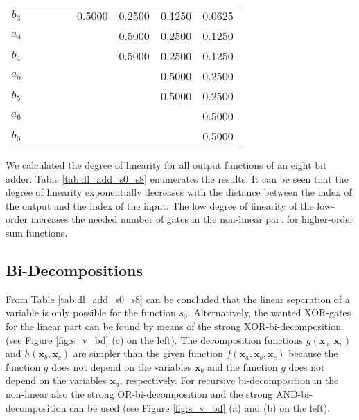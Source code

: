 \documentclass[a4paper]{article}
\newcommand\bx{\mathbf{x}}
\begin{document}
\begin{table}
\begin{tabular}{ccccccccc}
$b_3$	&         &        &        &        & 0.5000 & 0.2500 & 0.1250 & 0.0625 \\ %
$a_4$	&         &        &        &        &        & 0.5000 & 0.2500 & 0.1250 \\ %
$b_4$	&         &        &        &        &        & 0.5000 & 0.2500 & 0.1250 \\ %
$a_5$	&         &        &        &        &        &        & 0.5000 & 0.2500 \\ %
$b_5$	&         &        &        &        &        &        & 0.5000 & 0.2500 \\ %
$a_6$	&         &        &        &        &        &        &        & 0.5000 \\ %
$b_6$	&         &        &        &        &        &        &        & 0.5000 \\ %
\bottomrule
		\end{tabular}
\end{table}

We calculated the degree of linearity for all output functions of an eight bit adder. Table \ref{tab:dl_add_s0_s8} enumerates the results. It can be seen that the degree of linearity exponentially decreases with the distance between the index of the output and the index of the input. The low degree of linearity of the low-order increases the needed number of gates in the non-linear part for higher-order sum functions.

\subsection{Bi-Decompositions}

From Table \ref{tab:dl_add_s0_s8} can be concluded that the linear separation of a variable is only possible for the function $s_0$.
Alternatively, the wanted XOR-gates for the linear part can be found by means of the strong XOR-bi-decomposition (see Figure \ref{fig:s_v_bd} (c) on the left). The decomposition functions $g(\bx_a,\bx_c)$ and $h(\bx_b,\bx_c)$ are simpler than the given function $f(\bx_a,\bx_b,\bx_c)$ because the function $g$ does not depend on the variables $\bx_b$ and the function $g$ does not depend on the variables $\bx_a$, respectively. For recursive bi-decomposition in the non-linear also the strong OR-bi-decomposition and the strong AND-bi-decomposition can be used (see Figure \ref{fig:s_v_bd} (a) and (b) on the left).
\end{document}
